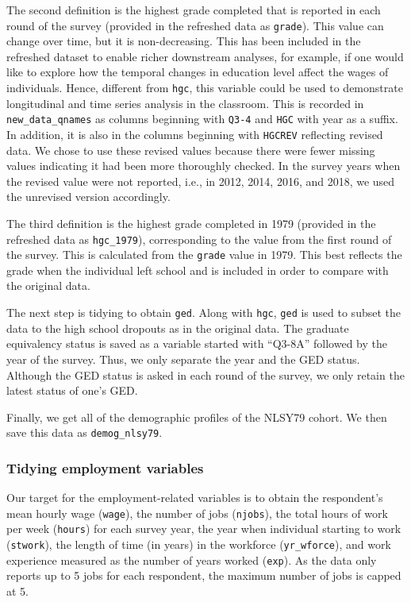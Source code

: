 \documentclass{article}
\begin{document}
The second definition is the highest grade completed that is reported in each round of the survey (provided in the refreshed data as \texttt{grade}). This value can change over time, but it is non-decreasing. This has been included in the refreshed dataset to enable richer downstream analyses, for example, if one would like to explore how the temporal changes in education level affect the wages of individuals. Hence, different from \texttt{hgc}, this variable could be used to demonstrate longitudinal and time series analysis in the classroom. This is recorded in \texttt{new\_data\_qnames} as columns beginning with \texttt{Q3-4} and \texttt{HGC} with year as a suffix. In addition, it is also in the columns beginning with \texttt{HGCREV} reflecting revised data. We chose to use these revised values because there were fewer missing values indicating it had been more thoroughly checked. In the survey years when the revised value were not reported, i.e., in 2012, 2014, 2016, and 2018, we used the unrevised version accordingly.

The third definition is the highest grade completed in 1979 (provided in the refreshed data as \texttt{hgc\_1979}), corresponding to the value from the first round of the survey. This is calculated from the \texttt{grade} value in 1979. This best reflects the grade when the individual left school and is included in order to compare with the original data.

The next step is tidying to obtain \texttt{ged}. Along with \texttt{hgc}, \texttt{ged} is used to subset the data to the high school dropouts as in the original data. The graduate equivalency status is saved as a variable started with ``Q3-8A'' followed by the year of the survey. Thus, we only separate the year and the GED status. Although the GED status is asked in each round of the survey, we only retain the latest status of one's GED.

Finally, we get all of the demographic profiles of the NLSY79 cohort. We then save this data as \texttt{demog\_nlsy79}.

\hypertarget{tidyemp}{%
\subsubsection{Tidying employment variables}\label{tidyemp}}

Our target for the employment-related variables is to obtain the respondent's mean hourly wage (\texttt{wage}), the number of jobs (\texttt{njobs}), the total hours of work per week (\texttt{hours}) for each survey year, the year when individual starting to work (\texttt{stwork}), the length of time (in years) in the workforce (\texttt{yr\_wforce}), and work experience measured as the number of years worked (\texttt{exp}). As the data only reports up to 5 jobs for each respondent, the maximum number of jobs is capped at 5.
\end{document}
